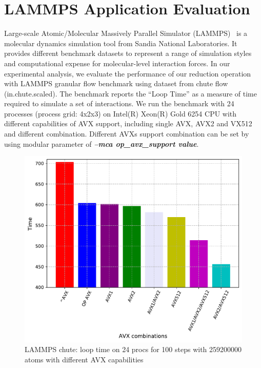 \documentclass[5p,times,twocolumn]{elsarticle}
\begin{document}
\section{LAMMPS Application Evaluation}\label{sec:hpcapplication}
Large-scale Atomic/Molecular Massively Parallel Simulator (LAMMPS)~\cite{PLIMPTON19951} is a
molecular dynamics simulation tool from Sandia National Laboratories.
It provides different benchmark datasets to represent a range of simulation styles
and computational expense for molecular-level interaction forces.
In our experimental analysis, we evaluate the performance of our reduction
operation with LAMMPS granular flow benchmark
using dataset from chute flow (in.chute.scaled).
The benchmark reports the “Loop Time” as a measure of
time required to simulate a set of interactions.
We run the benchmark with 24 processes (process
grid: 4x2x3) on Intel(R) Xeon(R) Gold 6254 CPU with different
capabilities of AVX support, including single AVX, AVX2 and VX512
and different combination. Different AVXs support combination can be set by using
modular parameter of \emph{\textbf{\textit{--mca op_avx_support value}}}.

\begin{figure}[h]
    \centering
    \includegraphics[width=\linewidth]{lammps_avx.pdf}
    \caption{LAMMPS chute: loop time on 24 procs for 100 steps with 259200000 atoms with different AVX capabilities}
    \label{fig:lammpsavx}
\end{figure}
\end{document}
